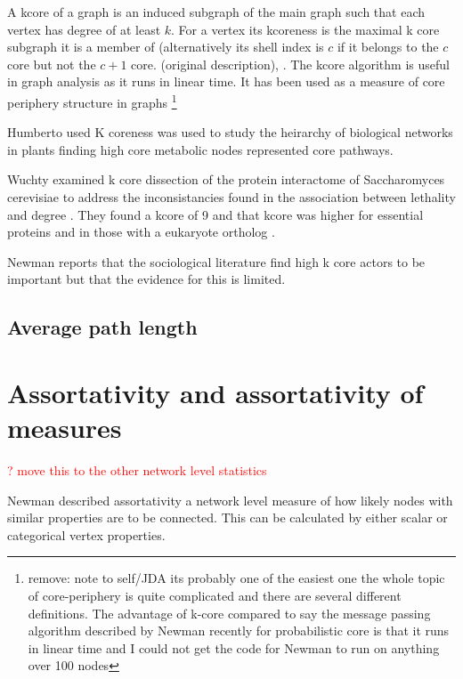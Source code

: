 A kcore of a graph is an induced subgraph of the main graph such that each vertex has degree of at least $k$. For a vertex its kcoreness is the maximal k core subgraph it is a member of (alternatively its shell index is $c$ if it belongs to the $c$ core but not the $c+1$ core. \cite{seidman1983network} (original description), \cite{alvarez2006large}. The kcore algorithm is useful in graph analysis as it runs in linear time. It has been used as a measure of core periphery structure in graphs \cite{newman2018networks}\footnote{remove: note to self/JDA its probably one of the easiest one the whole topic of core-periphery is quite complicated and there are several different definitions. The advantage of k-core compared to say the message passing algorithm described by Newman recently for probabilistic core is that it runs in linear time and I could not get the code for Newman to run on anything over 100 nodes}

Humberto used K coreness was used to study the heirarchy of biological networks in plants \cite{humberto2018hierarchical} finding high core metabolic nodes represented core pathways. 

Wuchty examined k core dissection of the protein interactome of Saccharomyces cerevisiae to address the inconsistancies found in the association between lethality and degree . They found a kcore of 9 and that kcore was higher for essential proteins and in those with a eukaryote ortholog \cite{wuchty2005peeling}.

Newman reports that the sociological literature find high k core actors to be important but that the evidence for this is limited.\cite{newman2018networks}

\subsection{Average path length}
\label{sec:Centrality intro average path length}

\section{Assortativity and assortativity of measures}
\label{sec:assortativity}
\textcolor{red}{? move this to the other network level statistics}

Newman described assortativity a network level measure of how likely nodes with similar properties are to be connected. \cite{newman2002assortative} This can be calculated by either scalar or categorical vertex properties.

